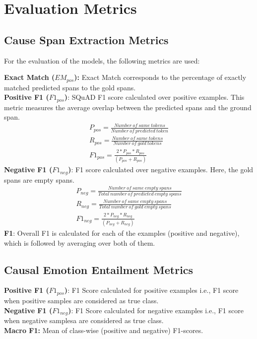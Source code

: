 \documentclass{article}
\begin{document}
\section{Evaluation Metrics}\label{app:metrics}
\subsection{Cause Span Extraction Metrics}
For the evaluation of the models, the following metrics are used:

\noindent\textbf{Exact Match ($EM_{pos}$):} Exact Match corresponds to the percentage of exactly matched predicted spans to the gold spans.\\
\textbf{Positive F1 ($F1_{pos}$)}: SQuAD F1 score \cite{rajpurkar2016squad} calculated over positive examples. This metric measures the average overlap between the predicted spans and the ground span. 
\begin{gather}
    P_{pos} = \frac{Number\ of\ same\ tokens}{Number\ of\ predicted\ token}\\
    R_{pos} = \frac{Number\ of\ same\ tokens}{Number\ of\ gold\ tokens}\\
    F1_{pos} = \frac{2*P_{pos}*R_{pos}}{(P_{pos} + R_{pos})}
\end{gather}
\textbf{Negative F1 ($F1_{neg}$)}: F1 score calculated over negative examples. Here, the gold spans are empty spans.
\begin{gather}
    P_{neg} = \frac{Number\ of\ same\ empty\ spans}{Total\ number\ of\ predicted\ empty\ spans}\\
    R_{neg} = \frac{Number\ of\ same\ empty\ spans}{Total\ number\ of\ gold\ empty\ spans}\\
    F1_{neg} = \frac{2*P_{neg}*R_{neg}}{(P_{neg} + R_{neg})}
\end{gather}
\textbf{F1}: Overall F1 is calculated for each of the examples (positive and negative), which is followed by averaging over both of them.

\subsection{Causal Emotion Entailment Metrics}
\textbf{Positive F1 ($F1_{pos}$)}: F1 Score calculated for positive examples i.e., F1 score when positive samples are considered as true class.\\
\textbf{Negative F1 ($F1_{neg}$)}: F1 Score calculated for negative examples i.e., F1 score when negative samplesa are considered as true class.\\
\textbf{Macro F1:} Mean of class-wise (positive and negative) F1-scores.
\end{document}
